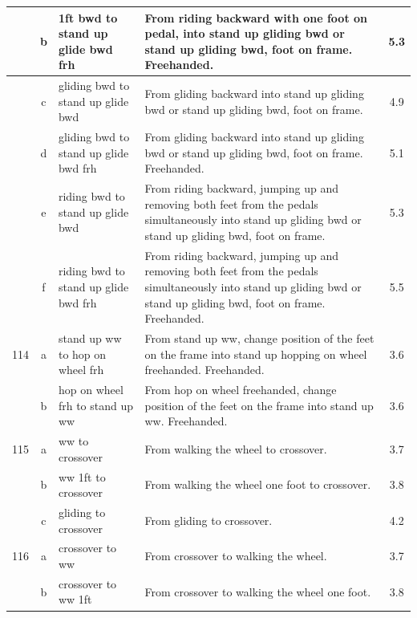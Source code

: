 \begin{longtable}{|r|c|p{4cm}|p{8cm}|c|}
\hline
  & b & 1ft bwd to stand up glide bwd frh & From riding backward with one foot on pedal, into stand up gliding bwd or stand up gliding bwd, foot on frame. Freehanded.  & 5.3 \\ 
\hline
  & c & gliding bwd to stand up glide bwd & From gliding backward into stand up gliding bwd or stand up gliding bwd, foot on frame. & 4.9 \\ 
\hline
  & d & gliding bwd to stand up glide bwd frh & From gliding backward into stand up gliding bwd or stand up gliding bwd, foot on frame. Freehanded. & 5.1 \\ 
\hline
  & e & riding bwd to stand up glide bwd  & From riding backward, jumping up and removing both feet from the pedals simultaneously into stand up gliding bwd or stand up gliding bwd, foot on frame.  & 5.3 \\ 
\hline
  & f & riding bwd to stand up glide bwd frh  & From riding backward, jumping up and removing both feet from the pedals simultaneously into stand up gliding bwd or stand up gliding bwd, foot on frame. Freehanded.  & 5.5 \\ 
\hline
114 & a & stand up ww to hop on wheel frh & From stand up ww, change position of the feet on the frame into stand up hopping on wheel freehanded. Freehanded. & 3.6 \\ 
\hline
  & b & hop on wheel frh to stand up ww & From hop on wheel freehanded, change position of the feet on the frame into stand up ww. Freehanded.  & 3.6 \\ 
\hline
115 & a & ww to crossover & From walking the wheel to crossover.  & 3.7 \\ 
\hline
  & b & ww 1ft to crossover & From walking the wheel one foot to crossover. & 3.8 \\ 
\hline
  & c & gliding to crossover  & From gliding to crossover.  & 4.2 \\ 
\hline
116 & a & crossover to ww & From crossover to walking the wheel.  & 3.7 \\ 
\hline
  & b & crossover to ww 1ft & From crossover to walking the wheel one foot. & 3.8 \\ 
\hline
\end{longtable}
\newpage

